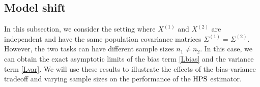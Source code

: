 




\subsection{Model shift}\label{sec_sizeratio}

 In this subsection, we consider the setting where $X^{(1)}$ and $X^{(2)}$ are independent and have the same population covariance matrices $\Sigma^{(1)}=\Sigma^{(2)}$. However, the two tasks can have different sample sizes $n_1\ne n_2$. In this case, we can obtain the exact asymptotic limits of the bias term \eqref{Lbias} and the variance term \eqref{Lvar}. We will use these results to illustrate the effects of the bias-variance tradeoff and varying sample sizes on the performance of the $\textup{HPS}$ estimator.

